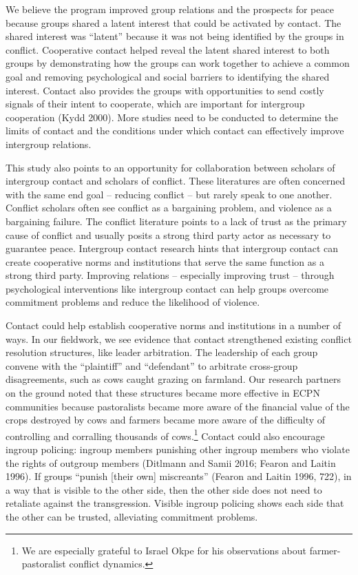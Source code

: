 \documentclass[11pt]{article}
\begin{document}
We believe the program improved group relations and the prospects for
peace because groups shared a latent interest that could be activated by
contact. The shared interest was ``latent'' because it was not being
identified by the groups in conflict. Cooperative contact helped reveal
the latent shared interest to both groups by demonstrating how the
groups can work together to achieve a common goal and removing
psychological and social barriers to identifying the shared interest.
Contact also provides the groups with opportunities to send costly
signals of their intent to cooperate, which are important for intergroup
cooperation (Kydd 2000). More studies need to be conducted to determine
the limits of contact and the conditions under which contact can
effectively improve intergroup relations.

This study also points to an opportunity for collaboration between
scholars of intergroup contact and scholars of conflict. These
literatures are often concerned with the same end goal -- reducing
conflict -- but rarely speak to one another. Conflict scholars often see
conflict as a bargaining problem, and violence as a bargaining failure.
The conflict literature points to a lack of trust as the primary cause
of conflict and usually posits a strong third party actor as necessary
to guarantee peace. Intergroup contact research hints that intergroup
contact can create cooperative norms and institutions that serve the
same function as a strong third party. Improving relations -- especially
improving trust -- through psychological interventions like intergroup
contact can help groups overcome commitment problems and reduce the
likelihood of violence.

Contact could help establish cooperative norms and institutions in a
number of ways. In our fieldwork, we see evidence that contact
strengthened existing conflict resolution structures, like leader
arbitration. The leadership of each group convene with the ``plaintiff''
and ``defendant'' to arbitrate cross-group disagreements, such as cows
caught grazing on farmland. Our research partners on the ground noted
that these structures became more effective in ECPN communities because
pastoralists became more aware of the financial value of the crops
destroyed by cows and farmers became more aware of the difficulty of
controlling and corralling thousands of cows.\footnote{We are especially
  grateful to Israel Okpe for his observations about farmer-pastoralist
  conflict dynamics.} Contact could also encourage ingroup policing:
ingroup members punishing other ingroup members who violate the rights
of outgroup members (Ditlmann and Samii 2016; Fearon and Laitin 1996).
If groups ``punish {[}their own{]} miscreants'' (Fearon and Laitin 1996,
722), in a way that is visible to the other side, then the other side
does not need to retaliate against the transgression. Visible ingroup
policing shows each side that the other can be trusted, alleviating
commitment problems.
\end{document}
